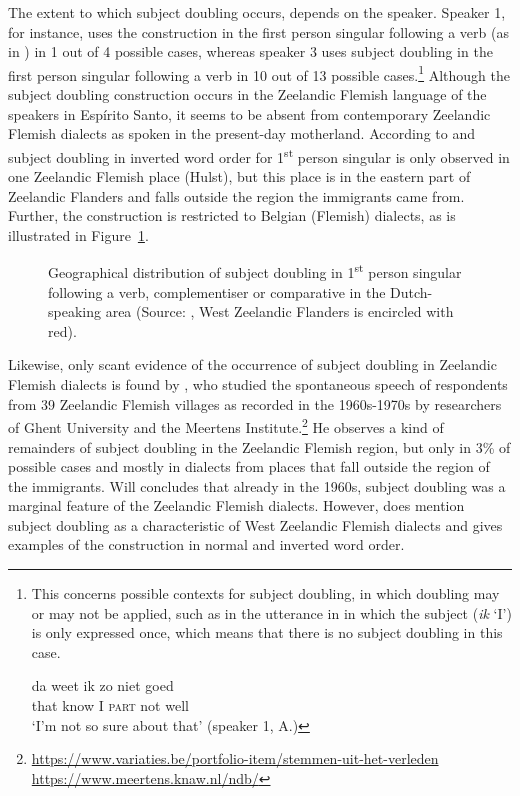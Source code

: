 \documentclass[output=paper,hidelinks,draftmode]{langscibook}
\begin{document}
The extent to which subject doubling occurs, depends on the speaker. Speaker 1, for instance, uses the construction in the first person singular following a verb (as in ) in 1 out of 4 possible cases, whereas speaker 3 uses subject doubling in the first person singular following a verb in 10 out of 13 possible cases.\footnote{This concerns possible contexts for subject doubling, in which doubling may or may not be applied, such as in the utterance in  in which the subject (\textit{ik} ‘I’) is only expressed once, which means that there is no subject doubling in this case.

\ea 
\label{ex:schaffel:00}
\gll da weet ik zo niet goed\\
that know I \textsc{part} not well\\
\glt `I'm not so sure about that’ (speaker 1, A.) 
\z
}
Although the subject doubling construction occurs in the Zeelandic Flemish language of the speakers in Espírito Santo, it seems to be absent from contemporary Zeelandic Flemish dialects as spoken in the present-day motherland. According to \citet[243]{DeVogelaer2008} and \citet{Barbiers2006} subject doubling in inverted word order for 1\textsuperscript{st} person singular is only observed in one Zeelandic Flemish place (Hulst), but this place is in the eastern part of Zeelandic Flanders and falls outside the region the immigrants came from. Further, the construction is restricted to Belgian (Flemish) dialects, as is illustrated in Figure~\ref{fig:schaffel:4}.


\begin{figure}
\caption{Geographical distribution of subject doubling in 1\textsuperscript{st} person singular following a verb, complementiser or comparative in the Dutch-speaking area (Source: \citealt[243]{DeVogelaer2008}, West Zeelandic Flanders is encircled with red).}
	\label{fig:schaffel:4}
\end{figure}


Likewise, only scant evidence of the occurrence of subject doubling in Zeelandic Flemish dialects is found by \citet{Will2004}, who studied the spontaneous speech of respondents from 39 Zeelandic Flemish villages as recorded in the 1960s-1970s by researchers of Ghent University and the Meertens Institute.\footnote{\url{https://www.variaties.be/portfolio-item/stemmen-uit-het-verleden} \url{https://www.meertens.knaw.nl/ndb/}} He observes a kind of remainders of subject doubling in the Zeelandic Flemish region, but only in 3\% of possible cases and mostly in dialects from places that fall outside the region of the immigrants. Will concludes that already in the 1960s, subject doubling was a marginal feature of the Zeelandic Flemish dialects. However, \citet[12]{BroeckedeMan1978} does mention subject doubling as a characteristic of West Zeelandic Flemish dialects and gives examples of the construction in normal and inverted word order.
\end{document}
